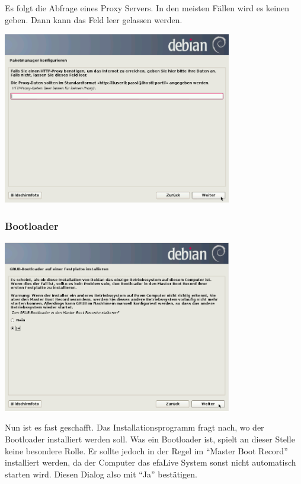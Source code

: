 \documentclass[a4paper,12pt,twoside]{article}
\begin{document}
Es folgt die Abfrage eines Proxy Servers. In den meisten Fällen wird es
keinen geben. Dann kann das Feld leer gelassen werden.

\begin{minipage}{\linewidth}
    \centering
    \includegraphics[width=10cm]{efaLivede-img/efaLivede-img16.png}
    \label{fig:auswahl_proxy}
\end{minipage}


\subsubsection{Bootloader}
\label{sct:bootloader}

\begin{minipage}{\linewidth}
    \centering
    \includegraphics[width=10cm]{efaLivede-img/efaLivede-img17.png}
    \label{fig:inst_grub}
\end{minipage}
\bigskip

Nun ist es fast geschafft. Das Installationsprogramm fragt nach, wo der
Bootloader installiert werden soll. Was ein Bootloader ist, spielt an
dieser Stelle keine besondere Rolle. Er sollte jedoch in der Regel im
"`Master Boot Record"' installiert werden, da
der Computer das efaLive System sonst nicht automatisch starten wird.
Diesen Dialog also mit "`Ja"' bestätigen.
\end{document}
